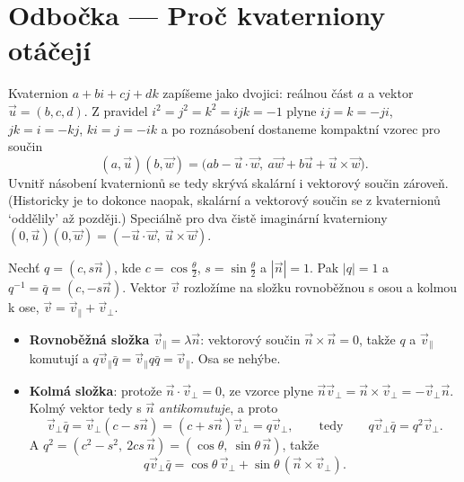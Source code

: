 \section{Odbočka --- Proč kvaterniony otáčejí}

Kvaternion $a + bi + cj + dk$ zapíšeme jako dvojici: reálnou část $a$ a vektor $\vec{u} = (b, c, d)$. Z pravidel $i^2 = j^2 = k^2 = ijk = -1$ plyne $ij = k = -ji$, $jk = i = -kj$, $ki = j = -ik$ a po roznásobení dostaneme kompaktní vzorec pro součin
\begin{equation*}
  (a, \vec{u})(b, \vec{w}) = \big(ab - \vec{u}\cdot\vec{w},\ a\vec{w} + b\vec{u} + \vec{u}\times\vec{w}\big).
\end{equation*}
Uvnitř násobení kvaternionů se tedy skrývá skalární i vektorový součin zároveň. (Historicky je to dokonce naopak, skalární a vektorový součin se z kvaternionů `oddělily' až později.) Speciálně pro dva čistě imaginární kvaterniony $(0, \vec{u})(0, \vec{w}) = (-\vec{u}\cdot\vec{w},\ \vec{u}\times\vec{w})$.

Nechť $q = (c, s\vec{n})$, kde $c = \cos\frac{\theta}{2}$, $s = \sin\frac{\theta}{2}$ a $|\vec{n}| = 1$. Pak $|q| = 1$ a $q^{-1} = \bar{q} = (c, -s\vec{n})$. Vektor $\vec{v}$ rozložíme na složku rovnoběžnou s osou a kolmou k ose, $\vec{v} = \vec{v}_\parallel + \vec{v}_\perp$.

\begin{itemize}
  \item \textbf{Rovnoběžná složka} $\vec{v}_\parallel = \lambda\vec{n}$: vektorový součin $\vec{n}\times\vec{n} = 0$, takže $q$ a $\vec{v}_\parallel$ komutují a $q\vec{v}_\parallel\bar{q} = \vec{v}_\parallel q\bar{q} = \vec{v}_\parallel$. Osa se nehýbe.
  \item \textbf{Kolmá složka}: protože $\vec{n}\cdot\vec{v}_\perp = 0$, ze vzorce plyne $\vec{n}\vec{v}_\perp = \vec{n}\times\vec{v}_\perp = -\vec{v}_\perp\vec{n}$. Kolmý vektor tedy s $\vec{n}$ \textit{antikomutuje}, a proto
  \begin{equation*}
    \vec{v}_\perp\bar{q} = \vec{v}_\perp(c - s\vec{n}) = (c + s\vec{n})\vec{v}_\perp = q\vec{v}_\perp,\qquad\text{tedy}\qquad q\vec{v}_\perp\bar{q} = q^2\vec{v}_\perp.
  \end{equation*}
  A $q^2 = (c^2 - s^2,\ 2cs\,\vec{n}) = (\cos\theta,\ \sin\theta\,\vec{n})$, takže
  \begin{equation*}
    q\vec{v}_\perp\bar{q} = \cos\theta\,\vec{v}_\perp + \sin\theta\,(\vec{n}\times\vec{v}_\perp).
  \end{equation*}
\end{itemize}

